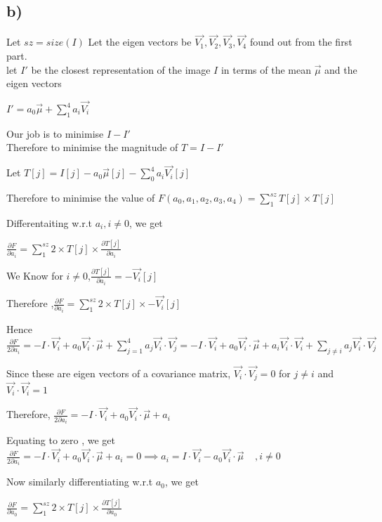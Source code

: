\documentclass{article}
\begin{document}
\subsection*{b)}
Let $sz = size(I)$
Let the eigen vectors be $\Vec{V_1},\Vec{V_2},\Vec{V_3},\Vec{V_4}$ found out from the first part. \\let $I'$ be the closest representation of the image $I$ in terms of the mean $\Vec{\mu}$ and the eigen vectors\par
$I' = a_0\Vec{\mu} + \sum_1^4 a_i\Vec{V_i}$                         \par 
Our job is to minimise $I-I'$\\
Therefore to minimise  the magnitude of $T = I-I'$\par 
Let $T[j] = I[j] - a_0\Vec{\mu}[j] - \sum_0^4 a_i \Vec{V_i}[j] $\par 
Therefore to minimise the value of $F(a_0,a_1,a_2,a_3,a_4) = \sum_1^{sz} T[j]\times T[j]$\par 
Differentaiting w.r.t $a_i,i\neq0$, we get\par 
$\frac{\partial F}{\partial a_i} = \sum_1^{sz} 2\times T[j] \times \frac{\partial T[j]}{\partial a_i} $\par
We Know for $i\neq 0$,$\frac{\partial T[j]}{\partial a_i} = -\Vec{V_i}[j]$\par 
Therefore ,$\frac{\partial F}{\partial a_i} = \sum_1^{sz} 2\times T[j] \times -\Vec{V_i}[j] $\par 
Hence $\frac{\partial F}{2\partial a_i} = -I\cdot\Vec{V_i}+a_0 \Vec{V_i}\cdot\Vec{\mu} + \sum_{j=1}^4 a_j\Vec{V_i}\cdot\Vec{V_j} = -I\cdot\Vec{V_i}+a_0 \Vec{V_i}\cdot\Vec{\mu} + a_i\Vec{V_i}\cdot\Vec{V_i}+\sum_{j\neq i} a_j\Vec{V_i}\cdot\Vec{V_j}$\par 
Since these are eigen vectors of a covariance matrix, $\Vec{V_i}\cdot\Vec{V_j}=0$ for $j\neq i$ and $\Vec{V_i}\cdot\Vec{V_i} = 1$\par 
Therefore, $\frac{\partial F}{2\partial a_i} = -I\cdot\Vec{V_i}+a_0 \Vec{V_i}\cdot\Vec{\mu}+a_i $\par 
Equating to zero , we get $\frac{\partial F}{2\partial a_i} = -I\cdot\Vec{V_i}+a_0 \Vec{V_i}\cdot\Vec{\mu}+a_i = 0 \implies \boxed{a_i = I\cdot\Vec{V_i}-a_0 \Vec{V_i}\cdot\Vec{\mu}\ \ \ \  \ ,i\neq 0} $\par 
Now similarly differentiating w.r.t $a_0$, we get \par 
$\frac{\partial F}{\partial a_0} = \sum_1^{sz} 2\times T[j] \times \frac{\partial T[j]}{\partial a_0} $\par
\end{document}

